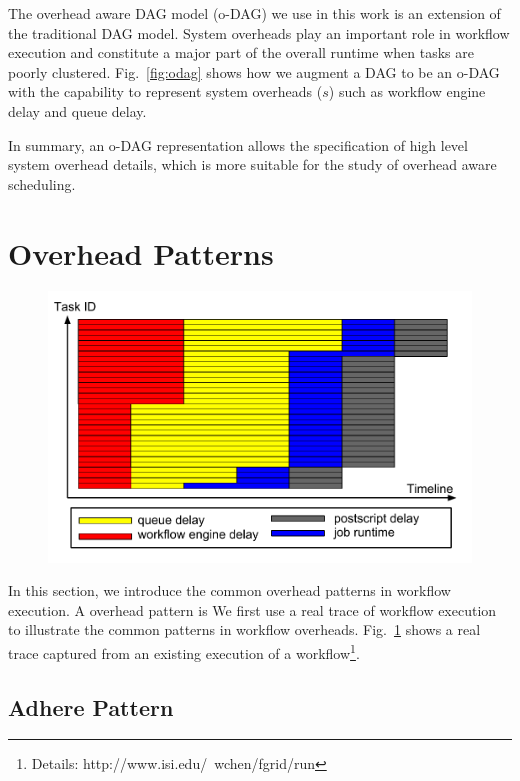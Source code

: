 \documentclass[final]{IEEEtran}
\begin{document}
The overhead aware DAG model (o-DAG) we use in this work is an extension of the traditional DAG model. System overheads play an important role in workflow execution and constitute a major part of the overall runtime when tasks are poorly clustered. Fig.~\ref{fig:odag} shows how we augment a DAG to be an o-DAG with the capability to represent system overheads ($s$) such as workflow engine delay and queue delay. 


In summary, an o-DAG representation allows the specification of high level system overhead details, which is more suitable for the study of overhead aware scheduling. 



\section{Overhead Patterns}
\begin{figure}[htb]
\centering
 \includegraphics[width=1\linewidth]{figure/trace.pdf}
  \label{fig:trace}
  \vspace{-10pt}
\end{figure}

In this section, we introduce the common overhead patterns in workflow execution. A overhead pattern is  
We first use a real trace of workflow execution to illustrate the common patterns in workflow overheads. 
Fig.~\ref{fig:trace} shows a real trace captured from an existing execution of a workflow\footnote{Details: http://www.isi.edu/~wchen/fgrid/run}. 

\subsection{Adhere Pattern}
\end{document}
